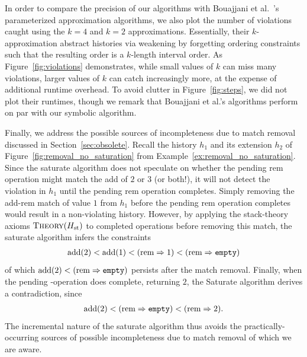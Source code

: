 In order to compare the precision of our algorithms with Bouajjani et
al.~\cite{conf/popl/BouajjaniEEH15}’s parameterized approximation algorithms,
we also plot the number of violations caught using the $k=4$ and $k=2$
approximations. Essentially, their $k$-approximation abstract histories via
weakening by forgetting ordering constraints such that the resulting order is a
$k$-length interval order. As Figure~\ref{fig:violations} demonstrates, while
small values of $k$ can miss many violations, larger values of $k$ can catch
increasingly more, at the expense of additional runtime overhead. To avoid
clutter in Figure~\ref{fig:steps}, we did not plot their runtimes, though we
remark that Bouajjani et al.’s algorithms perform on par with our {\sc
symbolic} algorithm.

Finally, we address the possible sources of incompleteness due to match removal
discussed in Section~\ref{sec:obsolete}. Recall the history $h_1$ and its
extension $h_2$ of Figure~\ref{fig:removal_no_saturation} from
Example~\ref{ex:removal_no_saturation}. Since the {\sc saturate} algorithm does
not speculate on whether the pending rem operation might match the 
add of $2$ or $3$ (or both!), it will not detect the violation in $h_1$ until
the pending rem operation completes. Simply removing the add-rem
match of value $1$ from $h_1$ before the pending rem operation
completes would result in a non-violating history. However, by applying the
stack-theory axioms $\textsc{Theory}(H_\mathrm{st})$ to completed operations
before removing this match, the {\sc saturate} algorithm infers the constraints
\begin{align*}
  \text{add}(2) < \text{add}(1) < (\text{rem} \Rightarrow 1) < (\text{rem} \Rightarrow {\tt empty})
\end{align*}
of which $\text{add}(2) < (\text{rem} \Rightarrow {\tt empty})$ persists after the
match removal. Finally, when the pending -operation does complete,
returning $2$, the {\sc Saturate} algorithm derives a contradiction, since
\begin{align*}
  \text{add}(2) < (\text{rem} \Rightarrow {\tt empty}) < (\text{rem} \Rightarrow 2).
\end{align*}
The incremental nature of the {\sc saturate} algorithm thus avoids the
practically-occurring sources of possible incompleteness due to match removal
of which we are aware.
